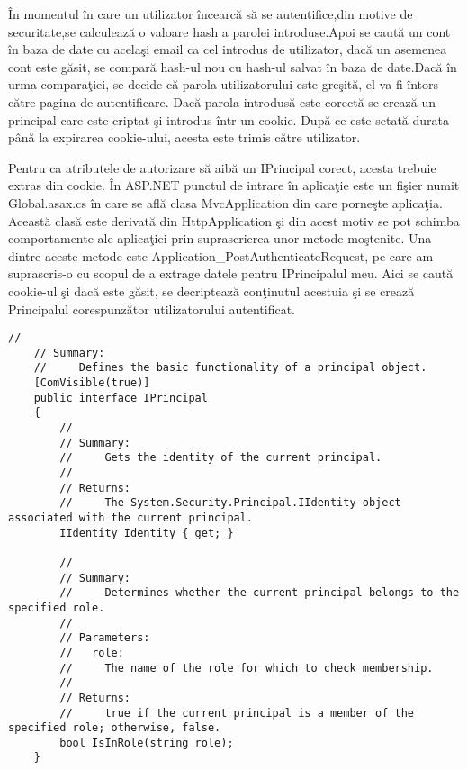 \documentclass[a4paper,12pt]{report}
\begin{document}
\^In momentul \^in care un utilizator \^incearc\u a s\u a se autentifice,din motive de securitate,se calculeaz\u a o valoare hash a parolei
introduse.Apoi se caut\u a un cont \^in baza de date cu acela\c si email ca cel introdus de utilizator, dac\u a un asemenea cont este g\u asit,
se compar\u a hash-ul nou cu hash-ul salvat \^in baza de date.Dac\u a \^in urma compara\c tiei, se decide c\u a parola utilizatorului este gre\c sit\u a, el
va fi \^intors c\u atre pagina de autentificare. Dac\u a parola introdus\u a este corect\u a se creaz\u a un principal care este criptat \c si 
introdus \^intr-un cookie. Dup\u a ce este setat\u a durata p\^an\u a la expirarea cookie-ului, acesta este trimis c\u atre utilizator.

Pentru ca atributele de autorizare s\u a aib\u a un IPrincipal corect, acesta trebuie extras din cookie.
\^In ASP.NET punctul de intrare \^in aplica\c tie este un fi\c sier numit Global.asax.cs \^in care se 
afl\u a clasa MvcApplication din care porne\c ste aplica\c tia. Aceast\u a clas\u a este derivat\u a din HttpApplication
\c si din acest motiv se pot schimba comportamente ale aplica\c tiei prin suprascrierea 
unor metode mo\c stenite. Una dintre aceste metode este Application\_PostAuthenticateRequest, pe care am suprascris-o 
cu scopul de a extrage datele pentru IPrincipalul meu. Aici se caut\u a cookie-ul \c si dac\u a este 
g\u asit, se decripteaz\u a con\c tinutul acestuia \c si se creaz\u a Principalul corespunz\u ator 
utilizatorului autentificat.



\begin{lstlisting}[caption={Interfa\c ta IPrincipal},label={lst:IPrincipal},breaklines]
    //
    // Summary:
    //     Defines the basic functionality of a principal object.
    [ComVisible(true)]
    public interface IPrincipal
    {
        //
        // Summary:
        //     Gets the identity of the current principal.
        //
        // Returns:
        //     The System.Security.Principal.IIdentity object associated with the current principal.
        IIdentity Identity { get; }

        //
        // Summary:
        //     Determines whether the current principal belongs to the specified role.
        //
        // Parameters:
        //   role:
        //     The name of the role for which to check membership.
        //
        // Returns:
        //     true if the current principal is a member of the specified role; otherwise, false.
        bool IsInRole(string role);
    }
\end{lstlisting}
\end{document}
